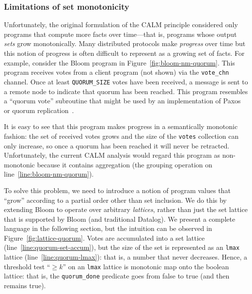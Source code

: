 \subsubsection{Limitations of set monotonicity}
Unfortunately, the original formulation of the CALM principle considered only
programs that compute more facts over time---that is, programs whose output
\emph{sets} grow monotonically. Many distributed protocols make \emph{progress}
over time but this notion of progress is often difficult to represent as a
growing set of facts. For example, consider the Bloom program in
Figure~\ref{fig:bloom-nm-quorum}. This program receives votes from a client
program (not shown) via the \texttt{vote\_chn} channel. Once at least
\texttt{QUORUM\_SIZE} votes have been received, a message is sent to a remote
node to indicate that quorum has been reached. This program resembles a ``quorum
vote'' subroutine that might be used by an implementation of
Paxos~\cite{Lamport1998} or quorum replication~\cite{Gifford1979}.

It is easy to see that this program makes progress in a semantically monotonic
fashion: the set of received votes grows and the size of the \texttt{votes}
collection can only increase, so once a quorum has been reached it will never be
retracted. Unfortunately, the current CALM analysis would regard this program as
non-monotonic because it contains aggregation (the grouping operation on
line~\ref{line:bloom-nm-quorum}).

To solve this problem, we need to introduce a notion of program values that
``grow'' according to a partial order other than set inclusion. We do this by
extending Bloom to operate over arbitrary \emph{lattices}, rather than just the
set lattice that is supported by Bloom (and traditional Datalog). We present a
complete language in the following section, but the intuition can be observed in
Figure~\ref{fig:lattice-quorum}. Votes are accumulated into a set lattice
(line~\ref{line:quorum-set-accum}), but the size of the set is represented as an
\texttt{lmax} lattice (line~\ref{line:quorum-lmax}): that is, a number that
never decreases. Hence, a threshold test ``$\ge k$'' on an \texttt{lmax} lattice
is monotonic map onto the boolean lattice: that is, the \texttt{quorum\_done}
predicate goes from false to true (and then remains true).

